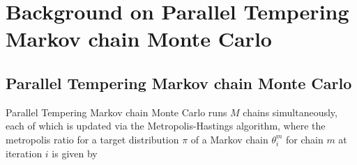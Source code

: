 \documentclass[10pt,twoside]{report} %
\begin{document}




\setcounter{secnumdepth}{2}

\setcounter{tocdepth}{2}

\newpage %










\chapter{Background on Parallel Tempering Markov chain Monte Carlo}
\section{Parallel Tempering Markov chain Monte Carlo}

Parallel Tempering  Markov chain Monte Carlo runs $M$ chains simultaneously, each of which is updated via the Metropolis-Hastings algorithm, where the metropolis ratio for a target distribution $\pi$ of a Markov chain $\theta_i^m$ for chain $m$ at iteration $i$ is given by 
\end{document}
